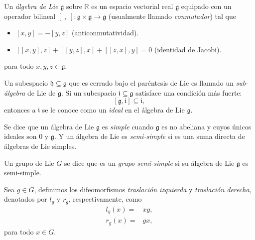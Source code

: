 \begin{mydef}
Un \emph{\'{a}lgebra de Lie} $\mathfrak{g}$ sobre $\mathbb{R}$ es un espacio vectorial real $\mathfrak{g}$ equipado con un operador bilineal $[\;, \;]: \mathfrak{g} \times \mathfrak{g} \rightarrow \mathfrak{g}$ (usualmente llamado \emph{conmutador}) tal que
%
\begin{itemize}
\item{$[x, y] = -[y, z]$ (anticonmutatividad).}
\item{$[[x, y], z] + [[y, z], x] + [[z, x], y] = 0$ (identidad de Jacobi).}
\end{itemize}
%
para todo $x, y, z \in \mathfrak{g}$.
\end{mydef}

\begin{mydef}
Un subespacio $\mathfrak{h} \subseteq \mathfrak{g}$ que es cerrado bajo el par\'{e}ntesis de Lie es llamado un \emph{sub-\'{a}lgebra} de Lie de $\mathfrak{g}$. Si un subespacio $\mathfrak {i} \subseteq \mathfrak {g}$ satisface una condici\'{o}n m\'{a}s fuerte:
%
\begin{equation*}
\left[ \mathfrak{g}, \mathfrak{i} \right] \subseteq \mathfrak{i},
\end{equation*}
%
entonces a $\mathfrak{i}$ se le conoce como un \emph{ideal} en el \'{a}lgebra de Lie $\mathfrak{g}$.
\end{mydef}

\begin{mydef}
Se dice que un \'{a}lgebra de Lie $\mathfrak{g}$ es \emph{simple} cuando $\mathfrak{g}$ es no abeliana y cuyos \'{u}nicos ideales son $0$ y $\mathfrak{g}$. Y un \'{a}lgebra de Lie es \emph{semi-simple} si es una suma directa de \'{a}lgebras de Lie simples.\end{mydef}

\begin{obs}
Un grupo de Lie $G$ se dice que es un \emph{grupo semi-simple} si su álgebra de Lie $\mathfrak{g}$ es semi-simple.
\end{obs}

\begin{mydef}
Sea $g \in G$, definimos los difeomorfismos \emph{traslaci\'{o}n izquierda} y \emph{traslaci\'{o}n derecha}, denotados por $l_{g}$ y $r_{g}$, respectivamente, como
%
\begin{align*}
l_{g} (x) = & x g, \\
r_{g} (x) = & g x,
\end{align*}
%
para todo $x \in G$.
\end{mydef}

